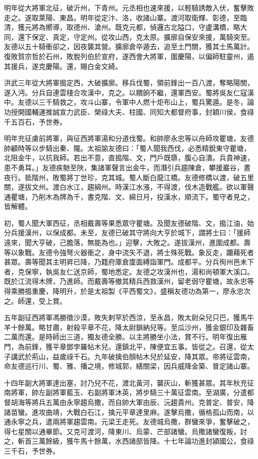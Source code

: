 \begin{pinyinscope}
明年從大將軍北征，破沂州，下青州。元丞相也速來援，以輕騎誘敵入伏，奮擊敗走之。遂取萊陽、東昌。明年從定汴、洛，收諸山寨。渡河取衛輝、彰德，至臨清，獲元將為嚮導，取德州、滄州。既克元都，偵邏古北隘口，守盧溝橋，略大同，還下保定、真定，守定州。從攻山西，克太原。擴廓自保安來援，萬騎突至。友德以五十騎衝卻之，因夜襲其營。擴廓倉卒遁去，追至土門關，獲其士馬萬計。復敗賀宗哲於石州，敗脫列伯於宣府，遂西會大將軍，圍慶陽，以偏師駐靈州，遏其援兵，遂克慶陽。還，賜白金文綺。

洪武三年從大將軍搗定西，大破擴廓。移兵伐蜀，領前鋒出一百八渡，奪略陽關，遂入沔。分兵自連雲棧合攻漢中，克之。以饋餉不繼，還軍西安。蜀將吳友仁寇漢中。友德以三千騎救之，攻斗山寨，令軍中人燃十炬布山上，蜀兵驚遁。是冬，論功授開國輔運推誠宣力武臣、榮祿大夫、柱國、同知大都督府事，封穎川侯，食祿千五百石，予世券。

明年充征虜前將軍，與征西將軍湯和分道伐蜀。和帥廖永忠等以舟師攻瞿塘，友德帥顧時等以步騎出秦、隴。太祖諭友德曰：「蜀人聞我西伐，必悉精銳東守瞿塘，北阻金牛，以抗我師。若出不意，直搗階、文，門戶既隳，腹心自潰。兵貴神速，患不勇耳。」友德疾馳至陜，集諸軍聲言出金牛，而潛引兵趨陳倉，攀援巖谷，晝夜行。抵階州，敗蜀將丁世珍，克其城。蜀人斷白龍江橋。友德修橋以渡，破五里關，遂拔文州。渡白水江，趨綿州。時漢江水漲，不得渡，伐木造戰艦。欲以軍聲通瞿塘，乃削木為牌為千，書克階、文、綿日月，投漢水，順流下。蜀守者見之，皆解體。

初，蜀人聞大軍西征，丞相戴壽等果悉眾守瞿塘。及聞友德破階、文，搗江油，始分兵援漢州，以保成都。未至，友德已破其守將向大亨於城下，謂將士曰：「援師遠來，聞大亨破，己膽落，無能為也。」迎擊，大敗之。遂拔漢州，進圍成都。壽等以象戰。友德令強弩火器衝之，身中流矢不退，將士殊死戰。象反走，躪藉死者甚眾。壽等聞其主明昇已降，乃籍府庫倉廩面縛詣軍門。成都平。分兵徇州邑未下者，克保寧，執吳友仁送京師，蜀地悉定。友德之攻漢州也，湯和尚頓軍大溪口。既於江流得木牌，乃進師。而戴壽等撤其精兵西救漢州，留老弱守瞿塘，故永忠等得乘勝搗重慶，降明升，於是太祖製《平西蜀文》，盛稱友德功為第一，廖永忠次之。師還，受上賞。

五年副征西將軍馮勝徵沙漠，敗失剌罕於西涼，至永昌，敗太尉朵兒只巴，獲馬牛羊十餘萬。略甘肅，射殺平章不花，降太尉鎖納兒等。至瓜沙州，獲金銀印及雜畜二萬而還。是時師出三道，獨友德全勝。以主將勝坐小法，賞不行。明年復出雁門，為前鋒，獲平章鄧孛羅帖木兒。還鎮北平，陳便宜五事。皆從之。召還，從太子講武於荊山，益歲祿千石。九年破擒伯顏帖木兒於延安，降其眾。帝將征雲南，命友德巡行川、蜀、雅、播之境，修城郭，繕關梁，因兵威降金築、普定諸山寨。

十四年副大將軍達出塞，討乃兒不花，渡北黃河，襲灰山，斬獲甚眾。其年秋充征南將軍，帥左副將軍藍玉、右副將軍沐英，將步騎三十萬征雲南。至湖廣，分遣都督胡海等將兵五萬由永寧趨烏撒，而自帥大軍由辰、沅趨貴州。克普定、普安，降諸苗蠻。進攻曲靖，大戰白石江，擒元平章達里麻。遂擊烏撒，循格孤山而南，以通永寧之兵，遣兩將軍趨雲南。元梁王走死。友德城烏撒，群蠻來爭，奮擊破之，得七星關以通畢節。又克可渡河，降東川、烏蒙、芒部諸蠻。烏撒諸蠻復叛，討之，斬首三萬餘級，獲牛馬十餘萬，水西諸部皆降。十七年論功進封潁國公，食祿三千石，予世券。


\end{pinyinscope}
